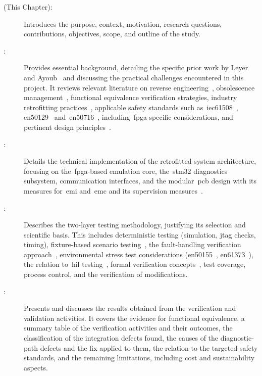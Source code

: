 \begin{description}
	\item[ (This Chapter):] Introduces the purpose, context, motivation, research questions, contributions, objectives, scope, and outline of the study.
	\item[:] {\setlength{\emergencystretch}{1em}Provides essential background, detailing the specific prior work by Leyer~\cite{leyer2023} and Ayoub~\cite{ayoub2014} and discussing the practical challenges encountered in this project. It reviews relevant literature on reverse engineering~\cite{wang2010}, obsolescence management~\cite{guzman2011obsolescence}, functional equivalence verification strategies, industry retrofitting practices~\cite{rg_class455_upgrade_2013, wabtec_wsp_cert_2022}, applicable safety standards such as~\gls{iec61508}~\cite{iec61508_2010}, \gls{en50129}~\cite{en50129_2018} and~\gls{en50716}~\cite{en50716_2023}, including~\gls{fpga}-specific considerations, and pertinent design principles~\cite{jones2004, ott2009emc}.\par}
	\item[:] Details the technical implementation of the retrofitted system architecture, focusing on the~\gls{fpga}-based emulation core, the~\gls{stm32} diagnostics subsystem, communication interfaces, and the modular~\gls{pcb} design with its measures for~\gls{emi} and~\gls{emc} and its supervision measures~\cite{ott2009emc}.
	\item[:] Describes the two-layer testing methodology, justifying its selection and scientific basis. This includes deterministic testing (simulation, \gls{jtag} checks, timing), fixture-based scenario testing~\cite{dolata2023}, the fault-handling verification approach~\cite{ziade2004faultinjection}, environmental stress test considerations (\gls{en50155}~\cite{en50155_2021}, \gls{en61373}~\cite{en61373_2010}), the relation to~\gls{hil} testing~\cite{hil_rail_suspension_2023, zhou_wu_2020}, formal verification concepts~\cite{formal_verification_rail_2023}, test coverage, process control, and the verification of modifications.
	\item[:] Presents and discusses the results obtained from the verification and validation activities. It covers the evidence for functional equivalence, a summary table of the verification activities and their outcomes, the classification of the integration defects found, the causes of the diagnostic-path defects and the fix applied to them, the relation to the targeted safety standards, and the remaining limitations, including cost and sustainability aspects.

\end{description}
